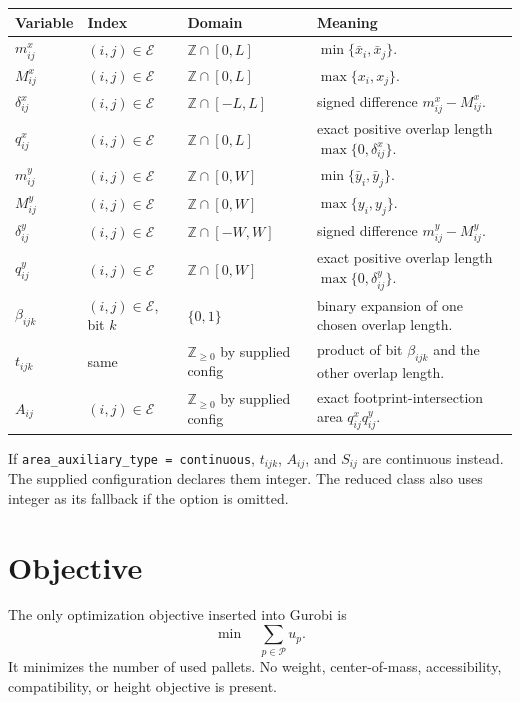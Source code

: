 \documentclass[11pt]{article}
\newcommand{\Pallets}{\mathcal P}
\newcommand{\Pairs}{\mathcal E}
\newcommand{\B}{\{0,1\}}
\newcommand{\Z}{\mathbb Z}
\begin{document}
\begin{longtable}{@{}p{2.8cm}p{2.7cm}p{2.8cm}p{6.2cm}@{}}
\toprule
Variable & Index & Domain & Meaning \\
\midrule
\endhead
$m^x_{ij}$ & $(i,j)\in\Pairs$ & $\Z\cap[0,L]$ & $\min\{\bar x_i,\bar x_j\}$.\\
$M^x_{ij}$ & $(i,j)\in\Pairs$ & $\Z\cap[0,L]$ & $\max\{x_i,x_j\}$.\\
$\delta^x_{ij}$ & $(i,j)\in\Pairs$ & $\Z\cap[-L,L]$ & signed difference $m^x_{ij}-M^x_{ij}$.\\
$q^x_{ij}$ & $(i,j)\in\Pairs$ & $\Z\cap[0,L]$ & exact positive overlap length $\max\{0,\delta^x_{ij}\}$.\\
$m^y_{ij}$ & $(i,j)\in\Pairs$ & $\Z\cap[0,W]$ & $\min\{\bar y_i,\bar y_j\}$.\\
$M^y_{ij}$ & $(i,j)\in\Pairs$ & $\Z\cap[0,W]$ & $\max\{y_i,y_j\}$.\\
$\delta^y_{ij}$ & $(i,j)\in\Pairs$ & $\Z\cap[-W,W]$ & signed difference $m^y_{ij}-M^y_{ij}$.\\
$q^y_{ij}$ & $(i,j)\in\Pairs$ & $\Z\cap[0,W]$ & exact positive overlap length $\max\{0,\delta^y_{ij}\}$.\\
$\beta_{ijk}$ & $(i,j)\in\Pairs$, bit $k$ & $\B$ & binary expansion of one chosen overlap length.\\
$t_{ijk}$ & same & $\Z_{\ge0}$ by supplied config & product of bit $\beta_{ijk}$ and the other overlap length.\\
$A_{ij}$ & $(i,j)\in\Pairs$ & $\Z_{\ge0}$ by supplied config & exact footprint-intersection area $q^x_{ij}q^y_{ij}$.\\
\bottomrule
\end{longtable}

If \texttt{area\_auxiliary\_type = continuous}, $t_{ijk}$, $A_{ij}$, and
$S_{ij}$ are continuous instead.  The supplied configuration declares them
integer.  The reduced class also uses integer as its fallback if the option is
omitted.

\section{Objective}

The only optimization objective inserted into Gurobi is
\begin{equation}
 \min\quad\sum_{p\in\Pallets}u_p.
 \label{eq:objective}
\end{equation}
It minimizes the number of used pallets.  No weight, center-of-mass,
accessibility, compatibility, or height objective is present.
\end{document}

